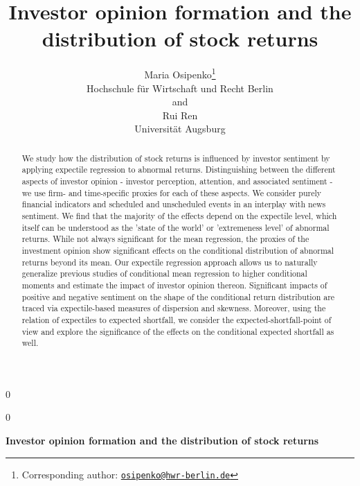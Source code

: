 \documentclass[11pt]{article}
\newcommand{\blind}{0}
\begin{document}
\def\spacingset#1{\renewcommand{\baselinestretch}%
{#1}\small\normalsize} \spacingset{1}

\blind
{
  \title{\bf Investor opinion formation and the distribution of stock returns}
  \author{Maria Osipenko\hspace{.2cm}\thanks{Corresponding author: \href{mailto:osipenko@hwr-berlin.de}{\nolinkurl{osipenko@hwr-berlin.de}}}\\
    Hochschule für Wirtschaft und Recht Berlin\\
    and \\
    Rui Ren \\
    Universität Augsburg}
  \maketitle
} \fi

\blind
{
  \bigskip
  \bigskip
  \bigskip
  \begin{center}
    {\LARGE\bf Investor opinion formation and the distribution of stock returns}
\end{center}
  \medskip
} \fi

\bigskip

\begin{abstract}
We study how the distribution of stock returns is influenced by investor sentiment by applying expectile regression to abnormal returns. Distinguishing between the different aspects of investor opinion - investor perception, attention, and associated sentiment - we use firm- and time-specific proxies for each of these aspects. We consider purely financial indicators and scheduled and unscheduled events in an interplay with news sentiment. We find that the majority of the effects depend on the expectile level, which itself can be understood as the 'state of the world' or 'extremeness level' of abnormal returns. While not always significant for the mean regression, the proxies of the investment opinion show significant effects on the conditional distribution of abnormal returns beyond its mean. Our expectile regression approach allows us to naturally generalize previous studies of conditional mean regression to higher conditional moments and estimate the impact of investor opinion thereon. Significant impacts of positive and negative sentiment on the shape of the conditional return distribution are traced via expectile-based measures of dispersion and skewness. Moreover, using the relation of expectiles to expected shortfall, we consider the expected-shortfall-point of view and explore the significance of the effects on the conditional expected shortfall as well.
\end{abstract}
\end{document}
